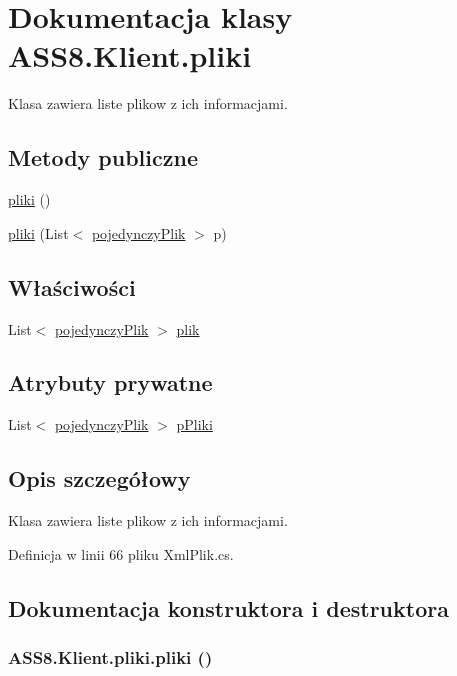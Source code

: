 \hypertarget{a00017}{
\section{Dokumentacja klasy ASS8.Klient.pliki}
\label{d4/d51/a00017}
}
Klasa zawiera liste plikow z ich informacjami.  


\subsection*{Metody publiczne}
\begin{CompactItemize}
\item 
\hyperlink{a00017_89b03ec0e156852f7da2f0ab5ae797dd}{pliki} ()
\item 
\hyperlink{a00017_b0ec2c54e1e801cd2f2d5dd2931a821a}{pliki} (List$<$ \hyperlink{a00020}{pojedynczyPlik} $>$ p)
\end{CompactItemize}
\subsection*{Właściwości}
\begin{CompactItemize}
\item 
List$<$ \hyperlink{a00020}{pojedynczyPlik} $>$ \hyperlink{a00017_0c7041e93f82e3c8ef7d6620292f7053}{plik}
\end{CompactItemize}
\subsection*{Atrybuty prywatne}
\begin{CompactItemize}
\item 
List$<$ \hyperlink{a00020}{pojedynczyPlik} $>$ \hyperlink{a00017_5017b8df3b1260060437b0a9a637cd09}{pPliki}
\end{CompactItemize}


\subsection{Opis szczegółowy}
Klasa zawiera liste plikow z ich informacjami. 



Definicja w linii 66 pliku XmlPlik.cs.

\subsection{Dokumentacja konstruktora i destruktora}
\hypertarget{a00017_89b03ec0e156852f7da2f0ab5ae797dd}{
\subsubsection[{pliki}]{\setlength{\rightskip}{0pt plus 5cm}ASS8.Klient.pliki.pliki ()}}
\label{d4/d51/a00017_89b03ec0e156852f7da2f0ab5ae797dd}




